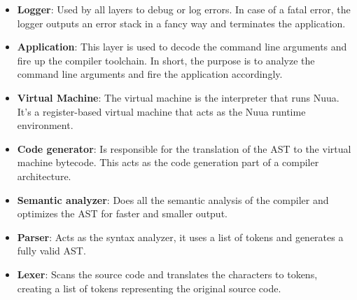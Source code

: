 \begin{itemize}
    \item \textbf{Logger}: Used by all layers to debug or log errors. In case of a fatal error, the logger outputs
        an error stack in a fancy way and terminates the application.
    \item \textbf{Application}: This layer is used to decode the command line arguments and fire up the compiler toolchain. In short,
        the purpose is to analyze the command line arguments and fire the application accordingly.
    \item \textbf{Virtual Machine}: The virtual machine is the interpreter that runs Nuua. It's a register-based virtual machine that
        acts as the Nuua runtime environment.
    \item \textbf{Code generator}: Is responsible for the translation of the AST to the virtual machine bytecode. This acts as the code generation
        part of a compiler architecture.
    \item \textbf{Semantic analyzer}: Does all the semantic analysis of the compiler and optimizes the AST for faster and smaller output.
    \item \textbf{Parser}: Acts as the syntax analyzer, it uses a list of tokens and generates a fully valid AST.
    \item \textbf{Lexer}: Scans the source code and translates the characters to tokens, creating a list of tokens representing
        the original source code.
\end{itemize}
